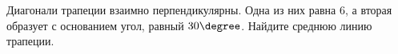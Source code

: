 \begin{ex}
	\begin{condition}
		Диагонали трапеции взаимно перпендикулярны. Одна из них равна \( 6 \), а вторая образует с основанием угол, равный \( 30\degree \). Найдите среднюю линию трапеции.
	\end{condition}
\end{ex}